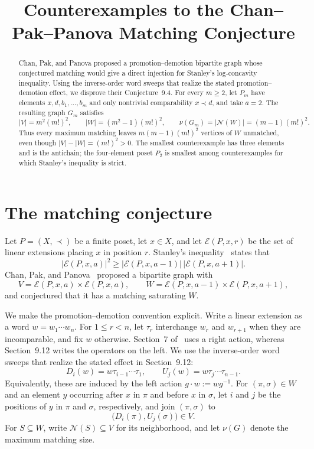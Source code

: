 \documentclass[11pt]{amsart}
\title[Counterexamples to the Chan--Pak--Panova conjecture]
{Counterexamples to the Chan--Pak--Panova Matching Conjecture}
\date{}
\newcommand{\cE}{\mathcal E}
\newcommand{\cN}{\mathcal N}
\begin{document}
\begin{abstract}
Chan, Pak, and Panova proposed a promotion--demotion bipartite graph whose
conjectured matching would give a direct injection for Stanley's log-concavity
inequality. Using the inverse-order word sweeps that realize the stated
promotion--demotion effect, we disprove their Conjecture~9.4. For every
$m\ge2$, let $P_m$ have elements $x,d,b_1,\ldots,b_m$ and only nontrivial
comparability $x\prec d$, and take $a=2$. The resulting graph $G_m$ satisfies
\[
 |V|=m^2(m!)^2,\qquad
 |W|=(m^2-1)(m!)^2,\qquad
 \nu(G_m)=|\cN(W)|=(m-1)(m!)^2.
\]
Thus every maximum matching leaves $m(m-1)(m!)^2$ vertices of $W$ unmatched,
even though $|V|-|W|=(m!)^2>0$. The smallest counterexample has three
elements and is the antichain; the four-element poset $P_2$ is smallest among
counterexamples for which Stanley's inequality is strict.
\end{abstract}

\maketitle

\section{The matching conjecture}

Let $P=(X,\prec)$ be a finite poset, let $x\in X$, and let
$\cE(P,x,r)$ be the set of linear extensions placing $x$ in position $r$.
Stanley's inequality~\cite{Sta81} states that
\begin{equation}\label{eq:stanley}
 |\cE(P,x,a)|^2
 \ge
 |\cE(P,x,a-1)|\,|\cE(P,x,a+1)|.
\end{equation}
Chan, Pak, and Panova~\cite[Conjecture~9.4]{CPP23} proposed a bipartite graph
with
\[
 V=\cE(P,x,a)\times\cE(P,x,a),
 \qquad
 W=\cE(P,x,a-1)\times\cE(P,x,a+1),
\]
and conjectured that it has a matching saturating $W$.

We make the promotion--demotion convention explicit. Write a linear extension
as a word $w=w_1\cdots w_n$. For $1\le r<n$, let $\tau_r$ interchange
$w_r$ and $w_{r+1}$ when they are incomparable, and fix $w$ otherwise.
Section~7 of~\cite{CPP23} uses a right action, whereas Section~9.12 writes the
operators on the left. We use the inverse-order word sweeps that realize the
stated effect in Section~9.12:
\begin{equation}\label{eq:sweeps}
 D_i(w)=w\tau_{i-1}\cdots\tau_1,
 \qquad
 U_j(w)=w\tau_j\cdots\tau_{n-1}.
\end{equation}
Equivalently, these are induced by the left action $g\cdot w:=wg^{-1}$.
For $(\pi,\sigma)\in W$ and an element $y$ occurring after $x$ in $\pi$ and
before $x$ in $\sigma$, let $i$ and $j$ be the positions of $y$ in $\pi$ and
$\sigma$, respectively, and join $(\pi,\sigma)$ to
\[
 \bigl(D_i(\pi),U_j(\sigma)\bigr)\in V.
\]
For $S\subseteq W$, write $\cN(S)\subseteq V$ for its neighborhood, and let
$\nu(G)$ denote the maximum matching size.
\end{document}
